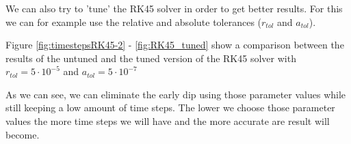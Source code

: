 \documentclass{article}
\begin{document}
    \clearpage

    \subsubsection{}
    We can also try to 'tune' the RK45 solver in order to get better results.
    For this we can for example use the relative and absolute tolerances ($r_{tol}$ and $a_{tol}$).

    Figure \ref{fig:timestepsRK45-2} - \ref{fig:RK45_tuned} show a comparison between the results of the untuned and the tuned version of the RK45 solver with $r_{tol} = 5 \cdot 10^{-5}$ and $a_{tol} = 5 \cdot 10^{-7}$

    \vspace{10pt}
    As we can see, we can eliminate the early dip using those parameter values while still keeping a low amount of time steps.
    The lower we choose those parameter values the more time steps we will have and the more accurate are result will become.
\end{document}
